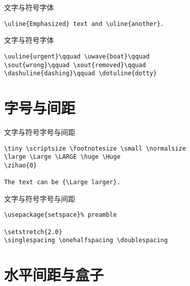 \documentclass[11pt]{beamer}
\begin{document}
\begin{frame}[fragile]{文字与符号}{字体}
\begin{Verbatim}[tabsize=2]
% 导言区用 \usepackage[normalem]{ulem}
\uline{Emphasized} text and \uline{another}.
\end{Verbatim}
\end{frame}

\begin{frame}[fragile]{文字与符号}{字体}
\begin{Verbatim}[tabsize=2]
\uuline{urgent}\qquad \uwave{boat}\qquad
\sout{wrong}\qquad \xout{removed}\qquad
\dashuline{dashing}\qquad \dotuline{dotty}
\end{Verbatim}
\end{frame}

\section{字号与间距}

\begin{frame}[fragile]{文字与符号}{字号与间距}
\begin{Verbatim}[tabsize=2]
\tiny \scriptsize \footnotesize \small \normalsize 
\large \Large \LARGE \huge \Huge
\zihao{0}

The text can be {\Large larger}.
\end{Verbatim}
\end{frame}

\begin{frame}[fragile]{文字与符号}{字号与间距}
\begin{Verbatim}[tabsize=2]
\usepackage{setspace}% preamble

\setstretch{2.0}
\singlespacing \onehalfspacing \doublespacing
\end{Verbatim}
\end{frame}

\section{水平间距与盒子}
\end{document}
